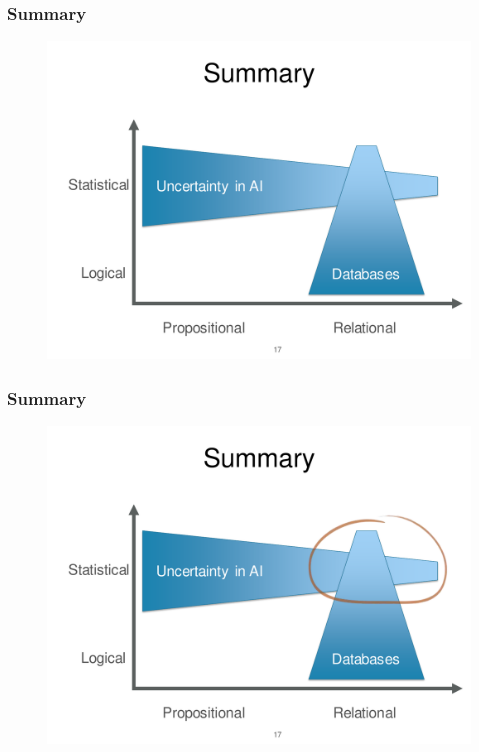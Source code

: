 \documentclass{beamer}
\begin{document}
\begin{frame}
\frametitle{Summary}
\begin{figure}[h]
\centering\includegraphics[width=0.95\linewidth]{summary1.pdf}
\end{figure}
\end{frame}

\begin{frame}
\frametitle{Summary}
\begin{figure}[h]
\centering\includegraphics[width=0.95\linewidth]{summary2.pdf}
\end{figure}
\end{frame}

%
\end{document}
